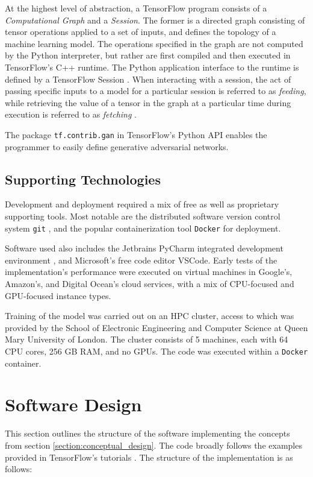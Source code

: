 \documentclass[12pt, titlepage]{report}
\theoremstyle{definition}
\begin{document}
At the highest level of abstraction, a TensorFlow program consists of a \textit{Computational Graph} and a \textit{Session}. The former is a directed graph consisting of tensor operations applied to a set of inputs, and defines the topology of a machine learning model. The operations specified in the graph are not computed by the Python interpreter, but rather are first compiled and then executed in TensorFlow's C++ runtime. The Python application interface to the runtime is defined by a TensorFlow Session \cite{tensorflow2018graphs}. When interacting with a session, the act of passing specific inputs to a model for a particular session is referred to as \textit{feeding}, while retrieving the value of a tensor in the graph at a particular time during execution is referred to as \textit{fetching} \cite{tensorflow2018intro}.

The package \texttt{tf.contrib.gan} in TensorFlow's Python API enables the programmer to easily define generative adversarial networks.



\subsection{Supporting Technologies}
Development and deployment required a mix of free as well as proprietary supporting tools. Most notable are the distributed software version control system \texttt{git} \cite{git2018}, and the popular containerization tool \texttt{Docker} \cite{docker2018} for deployment.

Software used also includes the Jetbrains PyCharm integrated development environment \cite{jetbrains2018pycharm}, and Microsoft's free code editor VSCode. Early tests of the implementation's performance were executed on virtual machines in Google's, Amazon's, and Digital Ocean's cloud services, with a mix of CPU-focused and GPU-focused instance types.

Training of the model was carried out on an HPC cluster, access to which was provided by the School of Electronic Engineering and Computer Science at Queen Mary University of London. The cluster consists of 5 machines, each with 64 CPU cores, 256 GB RAM, and no GPUs. The code was executed within a \texttt{Docker} container.


\section{Software Design}
This section outlines the structure of the software implementing the concepts from section \ref{section:conceptual_design}. The code broadly follows the examples provided in TensorFlow's tutorials \cite{tensorflow2018tutorials} \cite{tensorflow2018tfgan}. The structure of the implementation is as follows:
\end{document}

